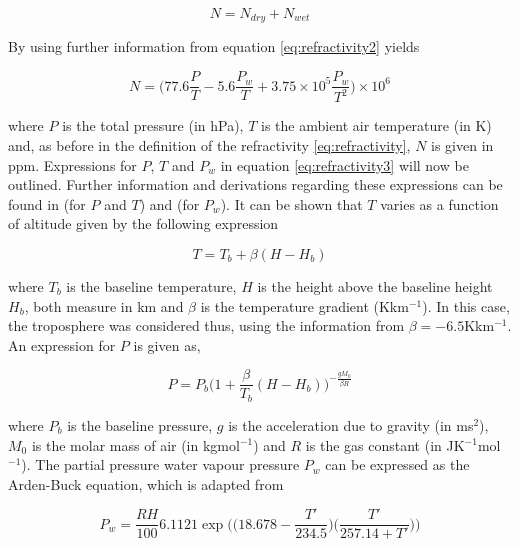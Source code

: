 \documentclass{article}
\begin{document}
\begin{equation}
N = N_{dry} + N_{wet}
\label{eq:refractivity2}
\end{equation}

\vspace{2mm}
\noindent
By using further information from \cite{Paper02} equation \eqref{eq:refractivity2} yields

\begin{equation}
N = \bigg(77.6\frac{P}{T} - 5.6\frac{P_w}{T} + 3.75 \times 10^5\frac{P_w}{T^2} \bigg) \times 10^6
\label{eq:refractivity3}
\end{equation}

\vspace{2mm}
\noindent
where $P$ is the total pressure (in hPa), $T$ is the ambient air temperature (in K) and, as before in the definition of the refractivity \eqref{eq:refractivity}, $N$ is given in ppm. Expressions for $P$, $T$ and $P_w$ in equation \eqref{eq:refractivity3} will now be outlined. Further information and derivations regarding these expressions can be found in \cite{Paper03} (for $P$ and $T$) and \cite{Paper04} (for $P_w$). It can be shown that $T$ varies as a function of altitude given by the following expression

\begin{equation}
T = T_b + \beta(H - H_b)
\label{eq:temperature}
\end{equation}

\vspace{2mm}
\noindent
where $T_b$ is the baseline temperature, $H$ is the height above the baseline height $H_b$, both measure in km and $\beta$ is the temperature gradient (Kkm$^{-1}$). In this case, the troposphere was considered thus, using the information from \cite{Paper03} $\beta = - 6.5$Kkm$^{-1}$. An expression for $P$ is given as,

\begin{equation}
P = P_b \bigg( 1 + \frac{\beta}{T_b}(H - H_b) \bigg) ^{-\frac{gM_0}{\beta R}}
\label{eq:pressure}
\end{equation}

\vspace{2mm}
\noindent
where $P_b$ is the baseline pressure, $g$ is the acceleration due to gravity (in ms$^2$), $M_0$ is the molar mass of air (in kgmol$^{-1}$) and $R$ is the gas constant (in JK$^{-1}$mol$^{-1}$). The partial pressure water vapour pressure $P_w$ can be expressed as the Arden-Buck equation, which is adapted from \cite{Paper04}

\begin{equation}
P_w = \frac{RH}{100} 6.1121 \exp \bigg( \bigg(18.678 - \frac{T'}{234.5} \bigg) \bigg (\frac{T'}{257.14 + T'} \bigg) \bigg)
\label{eq:Arden-Buck}
\end{equation}
\end{document}
